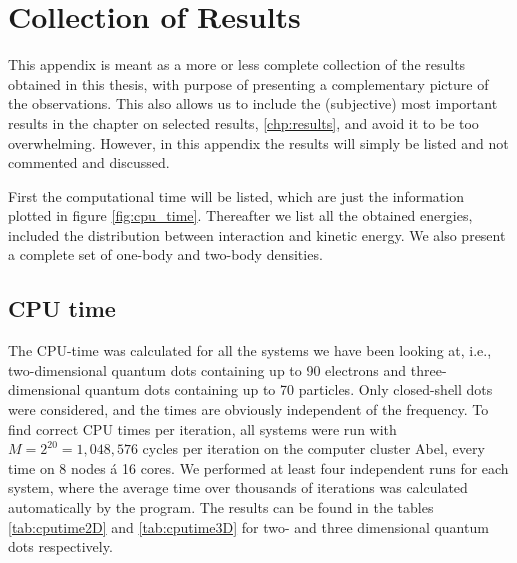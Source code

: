 \chapter{Collection of Results} \label{chp:totalresults}
This appendix is meant as a more or less complete collection of the results obtained in this thesis, with purpose of presenting a complementary picture of the observations. This also allows us to include the (subjective) most important results in the chapter on selected results, \ref{chp:results}, and avoid it to be too overwhelming. However, in this appendix the results will simply be listed and not commented and discussed.

First the computational time will be listed, which are just the information plotted in figure \eqref{fig:cpu_time}. Thereafter we list all the obtained energies, included the distribution between interaction and kinetic energy. We also present a complete set of one-body and two-body densities. 

\section{CPU time} \label{sec:cputime}
The CPU-time was calculated for all the systems we have been looking at, i.e., two-dimensional quantum dots containing up to 90 electrons and three-dimensional quantum dots containing up to 70 particles. Only closed-shell dots were considered, and the times are obviously independent of the frequency. To find correct CPU times per iteration, all systems were run with $M=2^{20}=1,048,576$ cycles per iteration on the computer cluster Abel, every time on 8 nodes á 16 cores. We performed at least four independent runs for each system, where the average time over thousands of iterations was calculated automatically by the program. The results can be found in the tables \eqref{tab:cputime2D} and \eqref{tab:cputime3D} for two- and three dimensional quantum dots respectively. 

